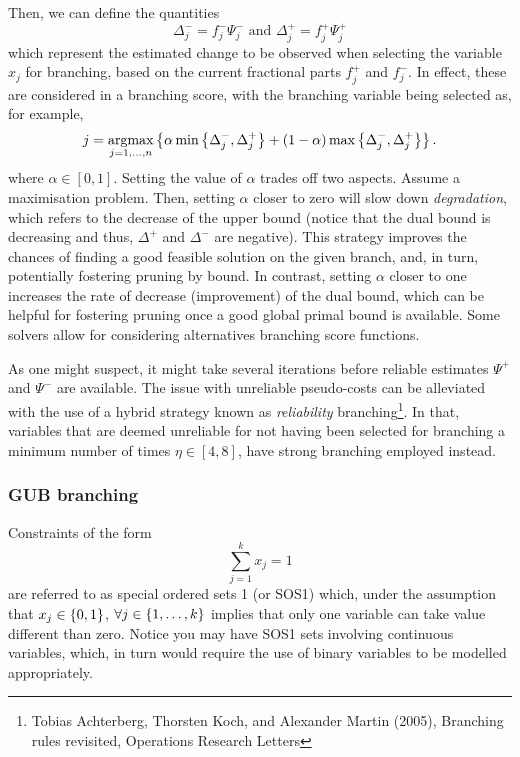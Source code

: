 Then, we can define the quantities
%
\begin{equation} \label{p1c11:eq:improvement_estimates}
	\Delta^-_j = f^-_j \Psi^-_j \text{ and } \Delta^+_j = f^+_j \Psi^+_j
\end{equation}
%
which represent the estimated change to be observed when selecting the variable $x_j$ for branching, based on the current fractional parts $f^+_j$ and $f^-_j$. In effect, these are considered in a branching score, with the branching variable being selected as, for example, 
%
\begin{equation*}
	j = \mathop{\rm argmax}_{j=1, \dots, n} \left\{  \alpha \min\left\{ \Delta^-_j, \Delta^+_j \right \} + (1-\alpha)\max\left\{ \Delta^-_j, \Delta^+_j \right \} \right \}.
\end{equation*}
%
where $\alpha \in [0,1]$. Setting the value of $\alpha$ trades off two aspects. Assume a maximisation problem. Then, setting $\alpha$ closer to zero will slow down \emph{degradation}, which refers to the decrease of the upper bound (notice that the dual bound is decreasing and thus, $\Delta^+$ and $\Delta^-$ are negative). This strategy improves the chances of finding a good feasible solution on the given branch, and, in turn, potentially fostering pruning by bound. In contrast, setting $\alpha$ closer to one increases the rate of decrease (improvement) of the dual bound, which can be helpful for fostering pruning once a good global primal bound is available. Some solvers allow for considering alternatives branching score functions. %

As one might suspect, it might take several iterations before reliable estimates $\Psi^+$ and $\Psi^-$ are available. The issue with unreliable pseudo-costs can be alleviated with the use of a hybrid strategy known as \emph{reliability} branching\footnote{Tobias Achterberg, Thorsten Koch, and Alexander Martin (2005), Branching rules revisited, Operations Research Letters}. In that, variables that are deemed unreliable for not having been selected for branching a minimum number of times $\eta \in [4,8]$, have strong branching employed instead.   

 
\subsubsection{GUB branching}
 
Constraints of the form 
%
\begin{equation*}
	\sum_{j = 1}^k x_j = 1	
\end{equation*}
%
are referred to as special ordered sets 1 (or SOS1) which, under the assumption that $x_j \in \left\{ 0,1 \right \}$, $\forall j \in \left\{ 1,\dots,k \right \}$ implies that only one variable can take value different than zero. Notice you may have SOS1 sets involving continuous variables, which, in turn would require the use of binary variables to be modelled appropriately. 

